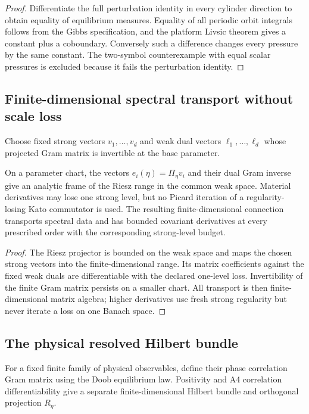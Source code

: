 \begin{proof}
Differentiate the full perturbation identity in every cylinder direction to
obtain equality of equilibrium measures.  Equality of all periodic orbit
integrals follows from the Gibbs specification, and the platform Livsic
theorem gives a constant plus a coboundary.  Conversely such a difference
changes every pressure by the same constant.  The two-symbol counterexample
with equal scalar pressures is excluded because it fails the perturbation
identity.
\end{proof}

\subsection{Finite-dimensional spectral transport without scale loss}
Choose fixed strong vectors $v_1,\ldots,v_d$ and weak dual vectors
$\ell_1,\ldots,\ell_d$ whose projected Gram matrix is invertible at the base
parameter.

\begin{theorem}
\label{thm:r11-c2-eigenbundle}
On a parameter chart, the vectors $e_i(\eta)=\Pi_\eta v_i$ and their dual
Gram inverse give an analytic frame of the Riesz range in the common weak
space.  Material derivatives may lose one strong level, but no Picard
iteration of a regularity-losing Kato commutator is used.  The resulting
finite-dimensional connection transports spectral data and has bounded
covariant derivatives at every prescribed order with the corresponding
strong-level budget.
\end{theorem}

\begin{proof}
The Riesz projector is bounded on the weak space and maps the chosen strong
vectors into the finite-dimensional range.  Its matrix coefficients against
the fixed weak duals are differentiable with the declared one-level loss.
Invertibility of the finite Gram matrix persists on a smaller chart.  All
transport is then finite-dimensional matrix algebra; higher derivatives use
fresh strong regularity but never iterate a loss on one Banach space.
\end{proof}

\subsection{The physical resolved Hilbert bundle}
For a fixed finite family of physical observables, define their phase
correlation Gram matrix using the Doob equilibrium law.  Positivity and A4
correlation differentiability give a separate finite-dimensional Hilbert
bundle and orthogonal projection $R_\eta$.

